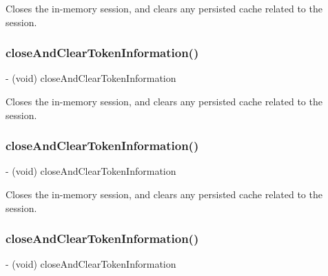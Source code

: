 Closes the in-\/memory session, and clears any persisted cache related to the session. \mbox{\label{interfaceFBSession_ac4ad0564da77b3cecc0c67f762f5f1c7}} 
\subsubsection{\texorpdfstring{close\+And\+Clear\+Token\+Information()}{closeAndClearTokenInformation()}\hspace{0.1cm}{\footnotesize\ttfamily [2/5]}}
{\footnotesize\ttfamily -\/ (void) close\+And\+Clear\+Token\+Information \begin{DoxyParamCaption}{ }\end{DoxyParamCaption}}

Closes the in-\/memory session, and clears any persisted cache related to the session. \mbox{\label{interfaceFBSession_ac4ad0564da77b3cecc0c67f762f5f1c7}} 
\subsubsection{\texorpdfstring{close\+And\+Clear\+Token\+Information()}{closeAndClearTokenInformation()}\hspace{0.1cm}{\footnotesize\ttfamily [3/5]}}
{\footnotesize\ttfamily -\/ (void) close\+And\+Clear\+Token\+Information \begin{DoxyParamCaption}{ }\end{DoxyParamCaption}}

Closes the in-\/memory session, and clears any persisted cache related to the session. \mbox{\label{interfaceFBSession_ac4ad0564da77b3cecc0c67f762f5f1c7}} 
\subsubsection{\texorpdfstring{close\+And\+Clear\+Token\+Information()}{closeAndClearTokenInformation()}\hspace{0.1cm}{\footnotesize\ttfamily [4/5]}}
{\footnotesize\ttfamily -\/ (void) close\+And\+Clear\+Token\+Information \begin{DoxyParamCaption}{ }\end{DoxyParamCaption}}

